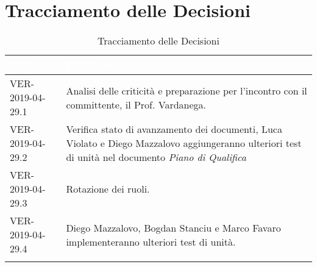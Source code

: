\newpage
\section{Tracciamento delle Decisioni}

\begin{longtable}{|C{.33\textwidth}|C{.61\textwidth}|}
\hline
{}\textbf{\textcolor{white}{Codice}} & \textbf{\textcolor{white}{Decisione}}\\
\hline
VER-2019-04-29.1 & Analisi delle criticità e preparazione per l'incontro con il committente, il Prof. Vardanega. \\
\hline
{}VER-2019-04-29.2 & Verifica stato di avanzamento dei documenti, Luca Violato e Diego Mazzalovo aggiungeranno ulteriori test di unità nel  documento \textit{Piano di Qualifica}  \\
\hline
VER-2019-04-29.3 & Rotazione dei ruoli. \\
\hline
{}VER-2019-04-29.4 & Diego Mazzalovo, Bogdan Stanciu e Marco Favaro implementeranno ulteriori test di unità.\\
\hline

\caption{Tracciamento delle Decisioni}
\end{longtable}
